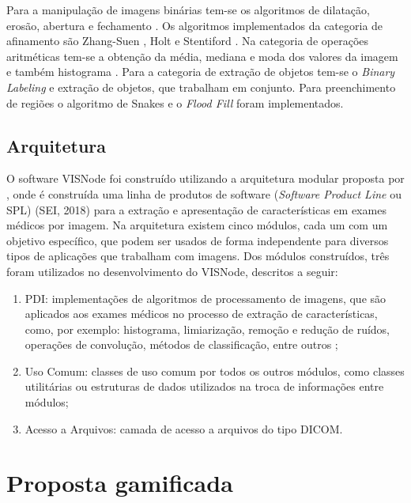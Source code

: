 \documentclass[
	12pt,				%
	oneside,			%
	a4paper,			%
	english,			%
	french,				%
	spanish,			%
	brazil,				%
	]{abntex2}
\begin{document}
Para a manipulação de imagens binárias tem-se os algoritmos de dilatação, erosão, abertura e fechamento \cite{gonzalesWoods:2008}. Os algoritmos implementados da categoria de afinamento são Zhang-Suen \cite{zhang1984fast}, Holt \cite{holt1987improved} e Stentiford \cite{stentiford1983some}. Na categoria de operações aritméticas tem-se a obtenção da média, mediana e moda dos valores da imagem e também histograma \cite{gonzalesWoods:2008}. Para a categoria de extração de objetos tem-se o \textit{Binary Labeling} \cite{gonzalesWoods:2008} e extração de objetos, que trabalham em conjunto. Para preenchimento de regiões o algoritmo de Snakes \cite{kass:1988} e o \textit{Flood Fill} \cite{gonzalesWoods:2008} foram implementados.

\subsection{Arquitetura}

O software VISNode foi construído utilizando a arquitetura modular proposta por \citet{reisferramenta}, onde é construída uma linha de produtos de software (\textit{Software Product Line} ou SPL) (SEI, 2018)  para a extração e apresentação de características em exames médicos por imagem. Na arquitetura existem cinco módulos, cada um com um objetivo específico, que podem ser usados de forma independente para diversos tipos de aplicações que trabalham com imagens. Dos módulos construídos, três foram utilizados no desenvolvimento do VISNode, descritos a seguir:

\begin{enumerate}
\item PDI: implementações de algoritmos de processamento de imagens, que são aplicados aos exames médicos no processo de extração de características, como, por exemplo: histograma, limiarização, remoção e redução de ruídos, operações de convolução, métodos de classificação, entre outros \cite{reisferramenta}; 
\item Uso Comum: classes de uso  comum  por todos os outros módulos, como classes utilitárias ou estruturas de dados utilizados na troca de informações entre módulos; 
\item Acesso a Arquivos: camada de acesso a arquivos do tipo DICOM.
\end{enumerate}

\section{Proposta gamificada}
\label{sec:propostaGamificada}
\end{document}
